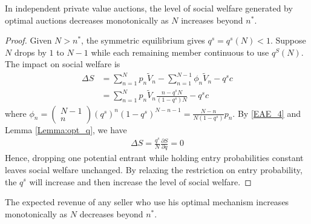 \documentclass[11pt]{elegantbook_2}
\begin{document}
\begin{proposition}
    In independent private value auctions, the level of social welfare generated by optimal auctions decreases monotonically as $N$ increases beyond $n^*$.
\end{proposition}
\begin{proof}
    Given $N>n^*$, the symmetric equilibrium gives $q^s=q^s(N)<1$. Suppose $N$ drops by $1$ to $N-1$ while each remaining member continuous to use $q^S(N)$. The impact on social welfare is
    \begin{equation}
        \begin{aligned}
            \Delta S&=\sum_{n=1}^Np_n\tilde{V}_n-\sum_{n=1}^{N-1}\phi_n\tilde{V}_n-q^sc\\
            &=\sum_{n=1}^Np_n\tilde{V}_n\frac{n-q^sN}{(1-q^s)N}-q^sc
        \end{aligned}
        \nonumber
    \end{equation}
    where $\phi_n=\begin{pmatrix}N-1\\n\end{pmatrix}(q^s)^{n}(1-q^s)^{N-n-1}=\frac{N-n}{N(1-q^s)}p_n$. By \eqref{EAE_4} and Lemma \ref{Lemma:opt_q}, we have
    \begin{equation}
        \begin{aligned}
            \Delta S=\frac{q^s}{N}\frac{\partial S}{\partial q}=0
        \end{aligned}
        \nonumber
    \end{equation}
    Hence, dropping one potential entrant while holding entry probabilities constant leaves social welfare unchanged. By relaxing the restriction on entry probability, the $q^s$ will increase and then increase the level of social welfare.
\end{proof}

\begin{corollary}
    The expected revenue of any seller who use his optimal mechanism increases monotonically as $N$ decreases beyond $n^*$.
\end{corollary}






























\end{document}
